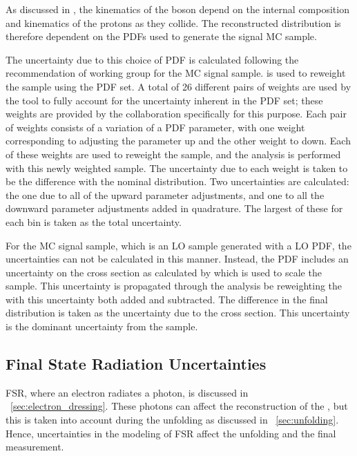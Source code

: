 As discussed in , the kinematics of
the \Z boson depend on the internal composition and kinematics of the protons
as they collide. The reconstructed \phistar distribution is therefore dependent
on the PDFs used to generate the signal MC sample.

The uncertainty due to this choice of PDF is calculated following the
recommendation of \PDFforLHC working group for the \POWHEG MC signal sample.
\PDFWeightProducer is used to reweight the \POWHEG sample using the \CTten PDF
set. A total of \num{26} different pairs of weights are used by the tool to
fully account for the uncertainty inherent in the PDF set; these weights are
provided by the \CTten collaboration specifically for this purpose. Each pair
of weights consists of a variation of a PDF parameter, with one weight
corresponding to adjusting the parameter up and the other weight to down. Each of
these weights are used to reweight the \POWHEG sample, and the analysis is
performed with this newly weighted sample.
The uncertainty due to each weight is taken to be the difference with the
nominal \phistar distribution. Two uncertainties are calculated: the
one due to all of the upward parameter adjustments, and one to all the downward
parameter adjustments added in quadrature. The largest of these for each
\phistar bin is taken as the total uncertainty.

For the \MADGRAPH MC signal sample, which is an LO sample generated with a LO
PDF, the uncertainties can not be calculated in this manner. Instead, the PDF
includes an uncertainty on the cross section as calculated by \FEWZ which is
used to scale the sample. This uncertainty is propagated through the analysis
be reweighting the \MADGRAPH with this uncertainty both added and subtracted.
The difference in the final \phistar distribution is taken as the uncertainty
due to the \FEWZ cross section. This uncertainty is the dominant uncertainty
from the \MADGRAPH sample.

\subsection{Final State Radiation Uncertainties}
\label{ssec:fsr_uncertainties}

FSR, where an electron radiates a photon, is discussed in
\SEC~\ref{sec:electron_dressing}. These photons can affect the reconstruction
of the \Z, but this is taken into account during the unfolding as discussed in
\SEC~\ref{sec:unfolding}. Hence, uncertainties in the modeling of FSR affect
the unfolding and the final measurement.

